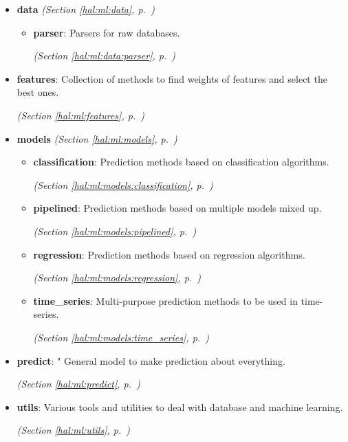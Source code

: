 \begin{itemize}
\setlength{\parskip}{0ex}
\item \textbf{data}
  \textit{(Section \ref{hal:ml:data}, p.~\pageref{hal:ml:data})}

  \begin{itemize}
\setlength{\parskip}{0ex}
    \item \textbf{parser}: Parsers for raw databases. 


  \textit{(Section \ref{hal:ml:data:parser}, p.~\pageref{hal:ml:data:parser})}

  \end{itemize}
\item \textbf{features}: Collection of methods to find weights of features and select the best ones. 


  \textit{(Section \ref{hal:ml:features}, p.~\pageref{hal:ml:features})}

\item \textbf{models}
  \textit{(Section \ref{hal:ml:models}, p.~\pageref{hal:ml:models})}

  \begin{itemize}
\setlength{\parskip}{0ex}
    \item \textbf{classification}: Prediction methods based on classification algorithms. 


  \textit{(Section \ref{hal:ml:models:classification}, p.~\pageref{hal:ml:models:classification})}

    \item \textbf{pipelined}: Prediction methods based on multiple models mixed up. 


  \textit{(Section \ref{hal:ml:models:pipelined}, p.~\pageref{hal:ml:models:pipelined})}

    \item \textbf{regression}: Prediction methods based on regression algorithms. 


  \textit{(Section \ref{hal:ml:models:regression}, p.~\pageref{hal:ml:models:regression})}

    \item \textbf{time\_series}: Multi-purpose prediction methods to be used in time-series. 


  \textit{(Section \ref{hal:ml:models:time_series}, p.~\pageref{hal:ml:models:time_series})}

  \end{itemize}
\item \textbf{predict}: " General model to make prediction about everything. 


  \textit{(Section \ref{hal:ml:predict}, p.~\pageref{hal:ml:predict})}

\item \textbf{utils}: Various tools and utilities to deal with database and machine learning. 


  \textit{(Section \ref{hal:ml:utils}, p.~\pageref{hal:ml:utils})}

\end{itemize}


